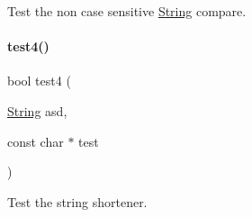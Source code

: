 Test the non case sensitive \mbox{\hyperlink{class_string}{String}} compare. 

\mbox{\label{atest_8h_ab545ece7a108a6470a3dc2161ba0008b}} 
\paragraph{\texorpdfstring{test4()}{test4()}}
{\footnotesize\ttfamily bool test4 (\begin{DoxyParamCaption}\item[{\mbox{\hyperlink{class_string}{String}}}]{asd,  }\item[{const char $\ast$}]{test }\end{DoxyParamCaption})}



Test the string shortener. 

